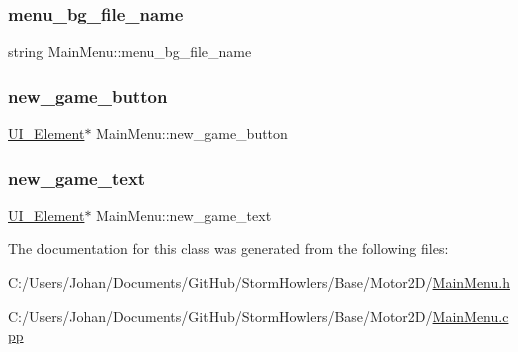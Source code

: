 \subsubsection{\texorpdfstring{menu\_bg\_file\_name}{menu\_bg\_file\_name}}
{\footnotesize\ttfamily string Main\+Menu\+::menu\+\_\+bg\+\_\+file\+\_\+name}

\mbox{\label{class_main_menu_a1b92e84d483b72207057f7b1773b19c0}} 
\subsubsection{\texorpdfstring{new\_game\_button}{new\_game\_button}}
{\footnotesize\ttfamily \mbox{\hyperlink{class_u_i___element}{U\+I\+\_\+\+Element}}$\ast$ Main\+Menu\+::new\+\_\+game\+\_\+button}

\mbox{\label{class_main_menu_a8dfe7dfc1c0bcc92e000529887aec722}} 
\subsubsection{\texorpdfstring{new\_game\_text}{new\_game\_text}}
{\footnotesize\ttfamily \mbox{\hyperlink{class_u_i___element}{U\+I\+\_\+\+Element}}$\ast$ Main\+Menu\+::new\+\_\+game\+\_\+text}



The documentation for this class was generated from the following files\+:\begin{DoxyCompactItemize}
\item 
C\+:/\+Users/\+Johan/\+Documents/\+Git\+Hub/\+Storm\+Howlers/\+Base/\+Motor2\+D/\mbox{\hyperlink{_main_menu_8h}{Main\+Menu.\+h}}\item 
C\+:/\+Users/\+Johan/\+Documents/\+Git\+Hub/\+Storm\+Howlers/\+Base/\+Motor2\+D/\mbox{\hyperlink{_main_menu_8cpp}{Main\+Menu.\+cpp}}\end{DoxyCompactItemize}

